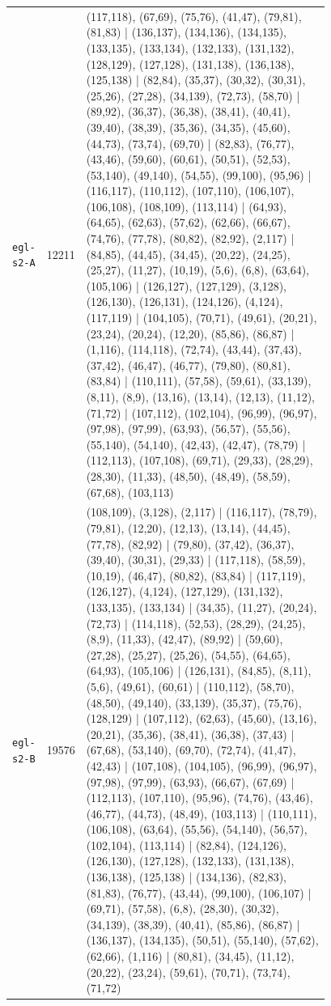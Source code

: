 \begin{landscape}
\begin{longtable}{lr>{\tiny\raggedright\arraybackslash}p{0.78\linewidth}}
\texttt{egl-s2-A} & 12211 & (117,118), (67,69), (75,76), (41,47), (79,81), (81,83) | (136,137), (134,136), (134,135), (133,135), (133,134), (132,133), (131,132), (128,129), (127,128), (131,138), (136,138), (125,138) | (82,84), (35,37), (30,32), (30,31), (25,26), (27,28), (34,139), (72,73), (58,70) | (89,92), (36,37), (36,38), (38,41), (40,41), (39,40), (38,39), (35,36), (34,35), (45,60), (44,73), (73,74), (69,70) | (82,83), (76,77), (43,46), (59,60), (60,61), (50,51), (52,53), (53,140), (49,140), (54,55), (99,100), (95,96) | (116,117), (110,112), (107,110), (106,107), (106,108), (108,109), (113,114) | (64,93), (64,65), (62,63), (57,62), (62,66), (66,67), (74,76), (77,78), (80,82), (82,92), (2,117) | (84,85), (44,45), (34,45), (20,22), (24,25), (25,27), (11,27), (10,19), (5,6), (6,8), (63,64), (105,106) | (126,127), (127,129), (3,128), (126,130), (126,131), (124,126), (4,124), (117,119) | (104,105), (70,71), (49,61), (20,21), (23,24), (20,24), (12,20), (85,86), (86,87) | (1,116), (114,118), (72,74), (43,44), (37,43), (37,42), (46,47), (46,77), (79,80), (80,81), (83,84) | (110,111), (57,58), (59,61), (33,139), (8,11), (8,9), (13,16), (13,14), (12,13), (11,12), (71,72) | (107,112), (102,104), (96,99), (96,97), (97,98), (97,99), (63,93), (56,57), (55,56), (55,140), (54,140), (42,43), (42,47), (78,79) | (112,113), (107,108), (69,71), (29,33), (28,29), (28,30), (11,33), (48,50), (48,49), (58,59), (67,68), (103,113) \\[2pt]
\texttt{egl-s2-B} & 19576 & (108,109), (3,128), (2,117) | (116,117), (78,79), (79,81), (12,20), (12,13), (13,14), (44,45), (77,78), (82,92) | (79,80), (37,42), (36,37), (39,40), (30,31), (29,33) | (117,118), (58,59), (10,19), (46,47), (80,82), (83,84) | (117,119), (126,127), (4,124), (127,129), (131,132), (133,135), (133,134) | (34,35), (11,27), (20,24), (72,73) | (114,118), (52,53), (28,29), (24,25), (8,9), (11,33), (42,47), (89,92) | (59,60), (27,28), (25,27), (25,26), (54,55), (64,65), (64,93), (105,106) | (126,131), (84,85), (8,11), (5,6), (49,61), (60,61) | (110,112), (58,70), (48,50), (49,140), (33,139), (35,37), (75,76), (128,129) | (107,112), (62,63), (45,60), (13,16), (20,21), (35,36), (38,41), (36,38), (37,43) | (67,68), (53,140), (69,70), (72,74), (41,47), (42,43) | (107,108), (104,105), (96,99), (96,97), (97,98), (97,99), (63,93), (66,67), (67,69) | (112,113), (107,110), (95,96), (74,76), (43,46), (46,77), (44,73), (48,49), (103,113) | (110,111), (106,108), (63,64), (55,56), (54,140), (56,57), (102,104), (113,114) | (82,84), (124,126), (126,130), (127,128), (132,133), (131,138), (136,138), (125,138) | (134,136), (82,83), (81,83), (76,77), (43,44), (99,100), (106,107) | (69,71), (57,58), (6,8), (28,30), (30,32), (34,139), (38,39), (40,41), (85,86), (86,87) | (136,137), (134,135), (50,51), (55,140), (57,62), (62,66), (1,116) | (80,81), (34,45), (11,12), (20,22), (23,24), (59,61), (70,71), (73,74), (71,72) \\[2pt]

\end{longtable}
\end{landscape}
